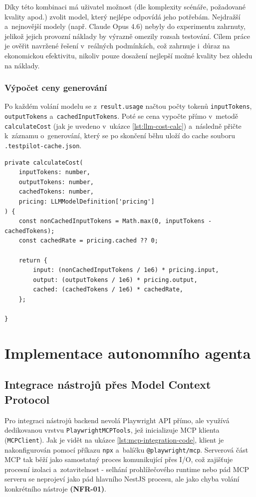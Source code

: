 \documentclass[czech, ing, kiv, he, iso690numb, viewonly]{fasthesis}
\begin{document}
Díky této kombinaci má uživatel možnost (dle komplexity scénáře, požadované kvality apod.) 
zvolit model, který nejlépe odpovídá jeho potřebám. Nejdražší a~nejnovější modely 
(např. Claude Opus 4.6) nebyly do experimentu zahrnuty, jelikož jejich provozní náklady 
by výrazně omezily rozsah testování. Cílem práce je ověřit navržené řešení v~reálných podmínkách, 
což zahrnuje i~důraz na ekonomickou efektivitu, nikoliv pouze dosažení nejlepší možné kvality bez ohledu na náklady.

\subsubsection*{Výpočet ceny generování}
Po každém volání modelu se z~\texttt{result.usage} načtou počty tokenů
\texttt{inputTokens}, \texttt{outputTokens} a~\texttt{cachedInputTokens}.
Poté se cena vypočte přímo v~metodě \texttt{calculateCost} (jak je uvedeno v~ukázce \ref{lst:llm-cost-calc}) a~následně 
přičte k~záznamu o~generování, který se po skončení běhu uloží do cache souboru \texttt{.testpilot-cache.json}.


\begin{lstlisting}[style=tscode, basicstyle=\ttfamily\scriptsize, caption={\protect\centering Výpočet ceny LLM dotazu.}, label={lst:llm-cost-calc}]
private calculateCost(
    inputTokens: number, 
    outputTokens: number, 
    cachedTokens: number, 
    pricing: LLMModelDefinition['pricing']
) {
    const nonCachedInputTokens = Math.max(0, inputTokens - cachedTokens);
    const cachedRate = pricing.cached ?? 0;

    return {
        input: (nonCachedInputTokens / 1e6) * pricing.input,
        output: (outputTokens / 1e6) * pricing.output,
        cached: (cachedTokens / 1e6) * cachedRate,
    };

}
\end{lstlisting}

\section{Implementace autonomního agenta}
\subsection{Integrace nástrojů přes Model Context Protocol}

Pro integraci nástrojů backend nevolá Playwright API přímo, ale využívá dedikovanou vrstvu \texttt{PlaywrightMCPTools},
jež inicializuje MCP klienta (\texttt{MCPClient}). Jak je vidět na ukázce \ref{lst:mcp-integration-code}, 
klient je nakonfigurován pomocí příkazu \texttt{npx} a~balíčku \texttt{@playwright/mcp}.
Serverová část MCP tak běží jako samostatný proces komunikující přes I/O, což zajišťuje procesní izolaci a~zotavitelnost - selhání prohlížečového runtime nebo pád MCP serveru se neprojeví jako pád hlavního NestJS procesu,
ale jako chyba volání konkrétního nástroje \textbf{(NFR-01)}. 
\end{document}

